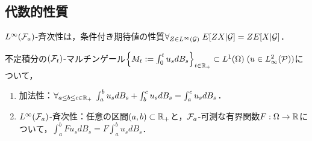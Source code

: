 \documentclass[uplatex,dvipdfmx]{jsreport}
\begin{document}
\subsection{代数的性質}

\begin{tcolorbox}[colframe=ForestGreen, colback=ForestGreen!10!white,breakable,colbacktitle=ForestGreen!40!white,coltitle=black,fonttitle=\bfseries\sffamily,
title=]
    $L^\infty(\mathcal{F}_a)$-斉次性は，条件付き期待値の性質$\forall_{Z\in L^\infty(\mathcal{G})}\;E[ZX|\mathcal{G}]=ZE[X|\mathcal{G}]$．
\end{tcolorbox}

\begin{proposition}[代数法則]
    不定積分の$(\mathcal{F}_t)$-マルチンゲール$\left\{M_t:=\int^t_0 u_sdB_s\right\}_{t\in\mathbb{R}_+}\subset L^1(\Omega)\;(u\in L^2_\infty(\mathcal{P}))$について，
    \begin{enumerate}
        \item 加法性：$\forall_{a\le b\le c\in\mathbb{R}_+}\;\int^b_au_sdB_s+\int^c_bu_sdB_s=\int^c_au_sdB_s$．
        \item $L^\infty(\mathcal{F}_a)$-斉次性：任意の区間$(a,b)\subset\mathbb{R}_+$と，$\mathcal{F}_a$-可測な有界関数$F:\Omega\to\mathbb{R}$について，$\int^b_aFu_sdB_s=F\int^b_au_sdB_s$．
    \end{enumerate}
\end{proposition}
\end{document}
